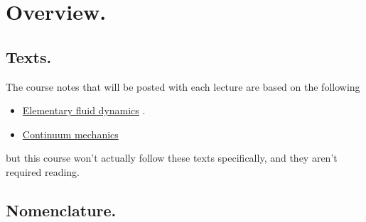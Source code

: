 %
%

\chapter{Overview.}
\label{chap:continuumL1}
{}
\date{Jan 11, 2012}

\beginArtWithToc

\section{Texts.}

The course notes that will be posted with each lecture are based on the following

\begin{itemize}
\item \href{http://www.amazon.com/Elementary-Dynamics-Applied-Mathematics-Computing/dp/0198596790/ref=sr_1_1?ie=UTF8&qid=1326302753&sr=8-1}{Elementary fluid dynamics} \cite{acheson1990elementary}.
\item \href{http://www.amazon.com/Theory-Elasticity-Third-Theoretical-Physics/dp/075062633X/ref=sr_1_6?s=books&ie=UTF8&qid=1326302957&sr=1-6}{Continuum mechanics} \cite{landau1960theory}
\end{itemize}


but this course won't actually follow these texts specifically, and they aren't required reading.

\section{Nomenclature.}

